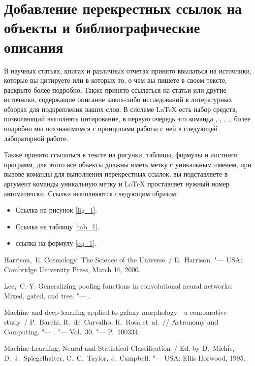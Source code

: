 \documentclass{report} %
\begin{document}
\section{Добавление перекрестных ссылок на объекты и библиографические описания}

В научных статьях, книгах и различных отчетах принято ввылаться на источники, которые вы цитируете или в которых то, о чем вы пишете в своем тексте, раскрыто более подробно. Также принято ссылаться на статьи или другие источники, содержащие описание каких-либо исследований в литературных обзорах для подкрепления ваших слов. В сислеме \LaTeX{} есть набор средств, позволяющий выполнять цитирование, в первую очередь это команда \cite{Harrison_Cosmology}, \cite{Michie2009}, \cite{Barchi_2020}, \cite{Lee2016},\cite{tag_1}, \cite{tag_2} более подробно мы похзнакомимся с принципами работы с ней в следующей лабораторной работе.

Также принято ссылаться в тексте на рисунки, таблицы, формулы и листинги программ, для этого все объекты должны иметь метку с уникальным именем, при вызове команды для выполнения перекрестных ссылок, вы подставляете в аргумент команды уникальную метку и \LaTeX{} проставляет нужный номер автоматичски. Ссылки выполняются следующим образом:

\begin{itemize}
	\item Ссылка на рисунок \ref{fig_1}.
	\item Ссылка на таблицу \ref{tab_1}.
	\item ссылка на формулу \eqref{eq_1}.
\end{itemize}





\begin{thebibliography}{1} %

{Harrison,~E.} Cosmology: The Science of the Universe~/ E.~Harrison.
  "---
\newblock USA: Cambridge University Press, March 16, 2000.

{Lee,~C.-Y.} Generalizing pooling functions in convolutional neural
 networks: Mixed, gated, and tree. "---
.

Machine and deep learning applied to galaxy morphology - a comparative study~/
  P.~Barchi, R.~de~Carvalho, R.~Rosa et~al.~// {Astronomy and
  Computing}. "---
. "---
\newblock Vol.~30. "---
\newblock P.~100334.

Machine Learning, Neural and Statistical Classification~/ Ed. by D.~Michie,
  D.~J.~Spiegelhalter, C.~C.~Taylor, J.~Campbell. "---
\newblock USA: Ellis Horwood, 1995.

\end{thebibliography}	
\end{document}
